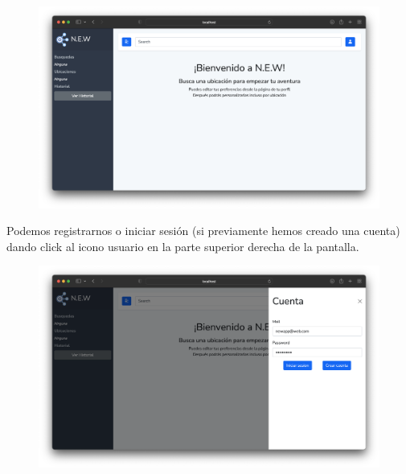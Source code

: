 \documentclass[../ei103948-project-documentation.tex]{subfiles}
\begin{document}
                                \begin{figure}[H]
                                    \begin{center}
                                        \hspace*{-7mm}
                                    \includegraphics[scale=0.342]{images/final1.png}
                                    \end{center}
                                \end{figure}

                                \vspace*{-5mm}
                                Podemos registrarnos o iniciar sesión (si previamente hemos creado una cuenta) dando click al icono usuario en la parte superior derecha de la pantalla.
                                \vspace*{-2mm}

                                \begin{figure}[H]
                                    \begin{center}
                                        \hspace*{-7mm}
                                    \includegraphics[scale=0.342]{images/final2.png}
                                    \end{center}
                                \end{figure}
\end{document}
